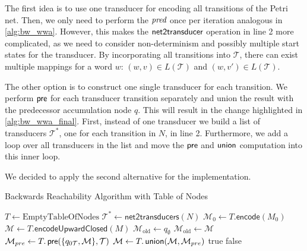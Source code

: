 \par

The first idea is to use one transducer for encoding all transitions of the Petri net. Then, we only need to perform the $\operatorname{\textit{pred}}$ once per iteration analogous in \autoref{alg:bw_wwa}. However, this makes the $\operatorname{\textsf{net2transducer}}$ operation in line 2 more complicated, as we need to consider non-determinism and possibly multiple start states for the transducer. By incorporating all transitions into $\mathcal{T}$, there can exist multiple mappings for a word $w$: $(w,v) \in L(\mathcal{T})$ and $(w,v') \in L(\mathcal{T})$. 

\par

The other option is to construct one single transducer for each transition. We perform $\operatorname{\textsf{pre}}$ for each transducer transition separately and union the result with the predecessor accumulation node $q$. This will result in the change highlighted in \autoref{alg:bw_wwa_final}. First, instead of one transducer we build a list of transducers $\mathcal{T}^{*}$, one for each transition in $N$, in line 2. Furthermore, we add a loop over all transducers in the list and move the $\operatorname{\textsf{pre}}$ and $\operatorname{\textsf{union}}$ computation into this inner loop.

\par

We decided to apply the second alternative for the implementation. 



\begin{algorithm}[htb]
\caption{Backwards Reachability Algorithm with Table of Nodes}\label{alg:bw_wwa_final}
\begin{algorithmic}[1]
\State $T \gets \text{EmptyTableOfNodes}$
\State $\mathcal{T}^{*} \gets \textsf{net2transducers}(N)$
\State $\mathcal{M}_{0} \gets T.\textsf{encode}(M_{0})$
\State $\mathcal{M} \gets T.\textsf{encodeUpwardClosed}(M)$
\State $\mathcal{M}_{\text{old}} \gets q_{\emptyset}$
	\State $\mathcal{M}_{\text{old}}  \gets \mathcal{M}$
	\State $\mathcal{M}_{pre} \gets T.\operatorname{\textsf{pre}}(\{q_{0\mathcal{T}},\mathcal{M}\},\mathcal{T})$
	\State $\mathcal{M} \gets T.\operatorname{\textsf{union}}(\mathcal{M}, \mathcal{M}_{pre})$
	\EndFor
{}
	\Return true
\EndIf
{}
    \Return false
\EndIf
\EndWhile
\end{algorithmic}
\end{algorithm}


